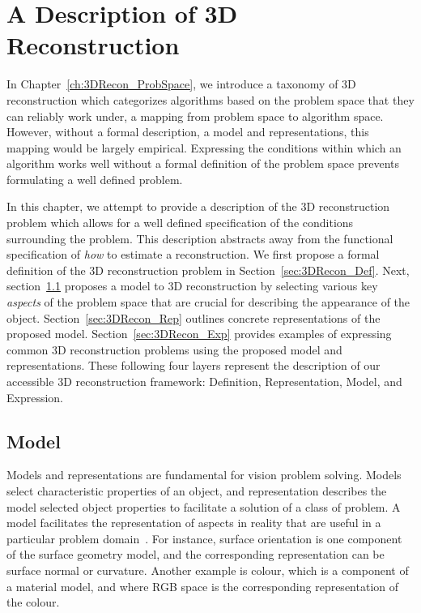 
\chapter{A Description of 3D Reconstruction}
\label{ch:3DRecon_Desc}
In Chapter~\ref{ch:3DRecon_ProbSpace}, we introduce a taxonomy of 3D reconstruction which categorizes algorithms based on the problem space that they can reliably work under, \ie a mapping from problem space to algorithm space. However, without a formal description, \ie a model and representations, this mapping would be largely empirical. Expressing the conditions within which an algorithm works well without a formal definition of the problem space prevents formulating a well defined problem.

In this chapter, we attempt to provide a description of the 3D reconstruction problem which allows for a well defined specification of the conditions surrounding the problem. This description abstracts away from the functional specification of \textit{how} to estimate a reconstruction. We first propose a formal definition of the 3D reconstruction problem in Section~\ref{sec:3DRecon_Def}. Next, section~\ref{sec:3DRecon_Model} proposes a model to 3D reconstruction by selecting various key \textit{aspects} of the problem space that are crucial for describing the appearance of the object. Section~\ref{sec:3DRecon_Rep} outlines concrete representations of the proposed model. Section~\ref{sec:3DRecon_Exp} provides examples of expressing common 3D reconstruction problems using the proposed model and representations. These following four layers represent the description of our accessible 3D reconstruction framework: Definition, Representation, Model, and Expression.


\section{Model}
\label{sec:3DRecon_Model}
Models and representations are fundamental for vision problem solving. Models select characteristic properties of an object, and representation describes the model selected object properties to facilitate a solution of a class of problem. A model facilitates the representation of aspects in reality that are useful in a particular problem domain~\cite{bolles19863dpo}. For instance, surface orientation is one component of the surface geometry model, and the corresponding representation can be surface normal or curvature. Another example is colour, which is a component of a material model, and where RGB space is the corresponding representation of the colour.

